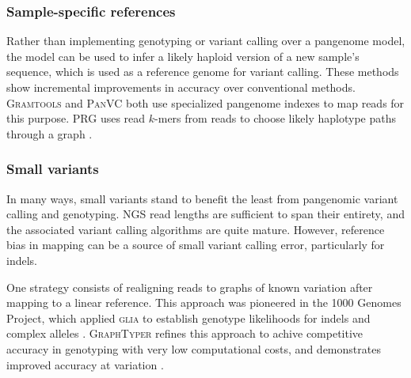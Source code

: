 \subsubsection{Sample-specific references}

Rather than implementing genotyping or variant calling over a pangenome model, the model can be used to infer a likely haploid version of a new sample's sequence, which is used as a reference genome for variant calling.
These methods show incremental improvements in accuracy over conventional methods.
\textsc{Gramtools} \cite{Maciuca_2016} and \textsc{PanVC} \cite{Valenzuela_2018} both use specialized pangenome indexes to map reads for this purpose.
\textsc{PRG} uses read $k$-mers from reads to choose likely haplotype paths through a graph \cite{dilthey2015improved}.

\subsubsection{Small variants}

In many ways, small variants stand to benefit the least from pangenomic variant calling and genotyping.
NGS read lengths are sufficient to span their entirety, and the associated variant calling algorithms are quite mature.
However, reference bias in mapping can be a source of small variant calling error, particularly for indels. %

One strategy consists of realigning reads to graphs of known variation after mapping to a linear reference.
This approach was pioneered in the 1000 Genomes Project, which applied \textsc{glia} to establish genotype likelihoods for indels and complex alleles \cite{1000_2015}.
\textsc{GraphTyper} refines this approach to achive competitive accuracy in genotyping with very low computational costs, and demonstrates improved accuracy at variation \cite{eggertsson2017graphtyper}.



